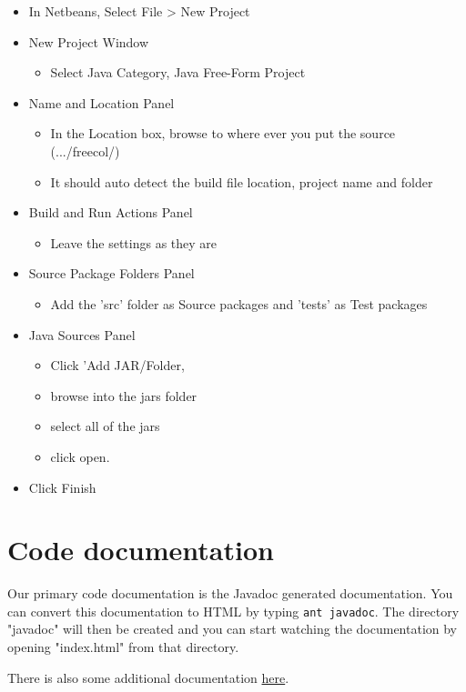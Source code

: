 \documentclass[12pt]{book}
\begin{document}
\begin{itemize}
\item In Netbeans, Select File > New Project
\item New Project Window
\begin{itemize}
\item Select Java Category, Java Free-Form Project
\end{itemize}
\item Name and Location Panel
\begin{itemize}
\item In the Location box, browse to where ever you put the source (.../freecol/)
\item It should auto detect the build file location, project name and folder
\end{itemize}
\item Build and Run Actions Panel
\begin{itemize}
\item Leave the settings as they are
\end{itemize}
\item Source Package Folders Panel
\begin{itemize}
\item Add the 'src' folder as Source packages and 'tests' as Test packages
\end{itemize}
\item Java Sources Panel
\begin{itemize}
\item Click 'Add JAR/Folder,
\item browse into the jars folder
\item select all of the jars
\item click open.
\end{itemize}
\item Click Finish
\end{itemize}

\hypertarget{Code documentation}{\section{Code documentation}}

Our primary code documentation is the Javadoc generated
documentation. You can convert this documentation to HTML by
typing \verb+ant javadoc+. The directory "javadoc" will then be
created and you can start watching the documentation by opening
"index.html" from that directory.

There is also some additional documentation
\href{http://www.freecol.org/documentation/}{here}.
\end{document}
